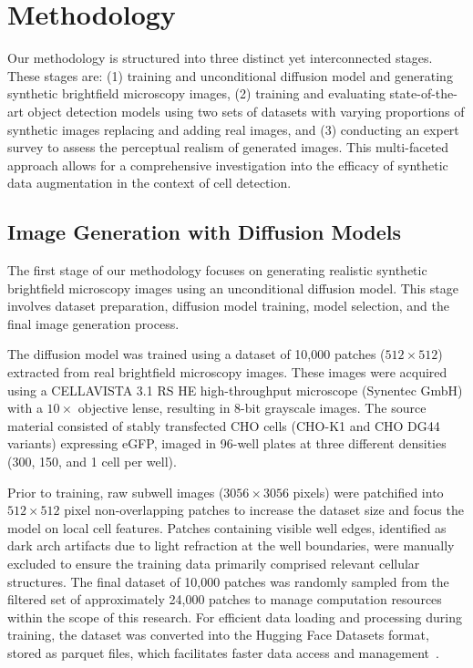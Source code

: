 \section{Methodology}
\label{sec:methodology}
Our methodology is structured into three distinct yet interconnected stages.
These stages are: (1) training and unconditional diffusion model and generating synthetic brightfield microscopy images, (2) training and evaluating state-of-the-art object detection models using two sets of datasets with varying proportions of synthetic images replacing and adding real images, and
(3) conducting an expert survey to assess the perceptual realism of generated images.
This multi-faceted approach allows for a comprehensive investigation into the efficacy of synthetic data augmentation in the context of cell detection.

\subsection{Image Generation with Diffusion Models}
\label{subsec:image-generation-with-diffusion-models}
The first stage of our methodology focuses on generating realistic synthetic brightfield microscopy images using an unconditional diffusion model.
This stage involves dataset preparation, diffusion model training, model selection, and the final image generation process.

The diffusion model was trained using a dataset of 10,000 patches ($512 \times 512$) extracted from real brightfield microscopy images.
These images were acquired using a CELLAVISTA 3.1 RS HE high-throughput microscope (Synentec GmbH) with a $10\times$ objective lense, resulting in 8-bit grayscale images.
The source material consisted of stably transfected CHO cells (CHO-K1 and CHO DG44 variants) expressing eGFP, imaged in 96-well plates at three different densities (300, 150, and 1 cell per well).

Prior to training, raw subwell images ($3056 \times 3056$ pixels) were patchified into $512 \times 512$ pixel non-overlapping patches to increase the dataset size and focus the model on local cell features.
Patches containing visible well edges, identified as dark arch artifacts due to light refraction at the well boundaries, were manually excluded to ensure the training data primarily comprised relevant cellular structures.
The final dataset of 10,000 patches was randomly sampled from the filtered set of approximately 24,000 patches to manage computation resources within the scope of this research.
For efficient data loading and processing during training, the dataset was converted into the Hugging Face Datasets format, stored as parquet files, which facilitates faster data access and management~\cite{vohra_apache_2016}.

